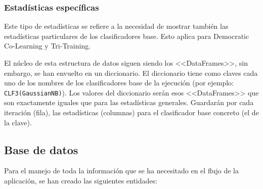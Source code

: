 \subsubsection{Estadísticas específicas}
Este tipo de estadísticas se refiere a la necesidad de mostrar también las
estadísticas particulares de los clasificadores base. Esto aplica para
Democratic Co-Learning y Tri-Training.

El núcleo de esta estructura de datos siguen siendo los <<DataFrames>>, sin
embargo, se han envuelto en un diccionario. El diccionario tiene como claves
cada uno de los nombres de los clasificadores base de la ejecución (por ejemplo:
\texttt{CLF3(GaussianNB)}). Los valores del diccionario serán esos
<<DataFrames>> que son exactamente iguales que para las estadísticas generales.
Guardarán por cada iteración (fila), las estadísticas (columnas) para el
clasificador base concreto (el de la clave).

\subsection{Base de datos}

Para el manejo de toda la información que se ha necesitado en el flujo de la
aplicación, se han creado las siguientes entidades:

